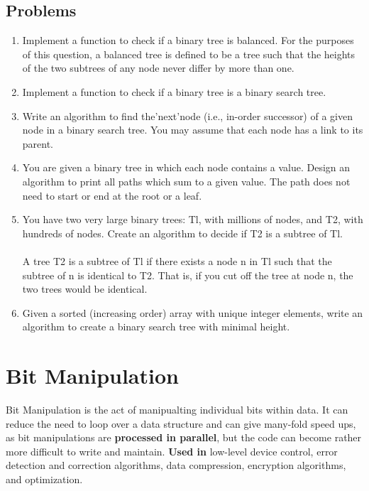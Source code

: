 \documentclass{article}
\begin{document}
\subsection{Problems}
	\begin{enumerate}
		\item Implement a function to check if a binary tree is balanced. For the purposes of this question, a balanced tree is defined to be a tree such that the heights of the two subtrees of any node never differ by more than one.
		\item Implement a function to check if a binary tree is a binary search tree.
		\item Write an algorithm to find the'next'node (i.e., in-order successor) of a given node in a binary search tree. You may assume that each node has a link to its parent.
		\item You are given a binary tree in which each node contains a value. Design an algorithm to print all paths which sum to a given value. The path does not need to start or end at the root or a leaf.
		\item You have two very large binary trees: Tl, with millions of nodes, and T2, with hundreds of nodes. Create an algorithm to decide if T2 is a subtree of Tl.
		\\ \\
		A tree T2 is a subtree of Tl if there exists a node n in Tl such that the subtree of n is identical to T2. That is, if you cut off the tree at node n, the two trees would be identical.
		\item Given a sorted (increasing order) array with unique integer elements, write an algorithm to create a binary search tree with minimal height.
	\end{enumerate}





\clearpage
\section{Bit Manipulation}

Bit Manipulation is the act of manipualting individual bits within data. It can reduce the need to loop over a data structure and can give many-fold speed ups, as bit manipulations are {\bf processed in parallel}, but the code can become rather more difficult to write and maintain. {\bf Used in} low-level device control, error detection and correction algorithms, data compression, encryption algorithms, and optimization.
\end{document}

